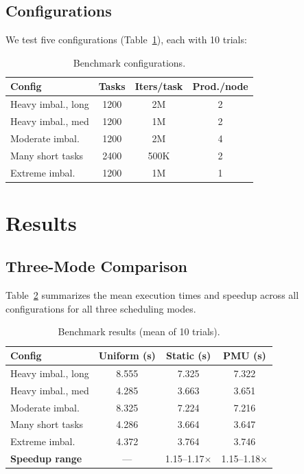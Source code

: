 \documentclass[conference]{IEEEtran}
\begin{document}
\subsection{Configurations}

We test five configurations (Table~\ref{tab:configs}), each with 10 trials:

\begin{table}[h]
\centering
\caption{Benchmark configurations.}
\begin{tabular}{lccc}
\toprule
\textbf{Config} & \textbf{Tasks} & \textbf{Iters/task} & \textbf{Prod./node} \\
\midrule
Heavy imbal., long  & 1200 & 2M & 2 \\
Heavy imbal., med   & 1200 & 1M & 2 \\
Moderate imbal.     & 1200 & 2M & 4 \\
Many short tasks    & 2400 & 500K & 2 \\
Extreme imbal.      & 1200 & 1M & 1 \\
\bottomrule
\end{tabular}
\label{tab:configs}
\end{table}

\section{Results}

\subsection{Three-Mode Comparison}

Table~\ref{tab:results} summarizes the mean execution times and speedup across all configurations for all three scheduling modes.

\begin{table}[h]
\centering
\caption{Benchmark results (mean of 10 trials).}
\small
\begin{tabular}{lccc}
\toprule
\textbf{Config} & \textbf{Uniform (s)} & \textbf{Static (s)} & \textbf{PMU (s)} \\
\midrule
Heavy imbal., long  & 8.555 & 7.325 & 7.322 \\
Heavy imbal., med   & 4.285 & 3.663 & 3.651 \\
Moderate imbal.     & 8.325 & 7.224 & 7.216 \\
Many short tasks    & 4.286 & 3.664 & 3.647 \\
Extreme imbal.      & 4.372 & 3.764 & 3.746 \\
\midrule
\textbf{Speedup range} & --- & 1.15--1.17$\times$ & 1.15--1.18$\times$ \\
\bottomrule
\end{tabular}
\label{tab:results}
\end{table}
\end{document}
